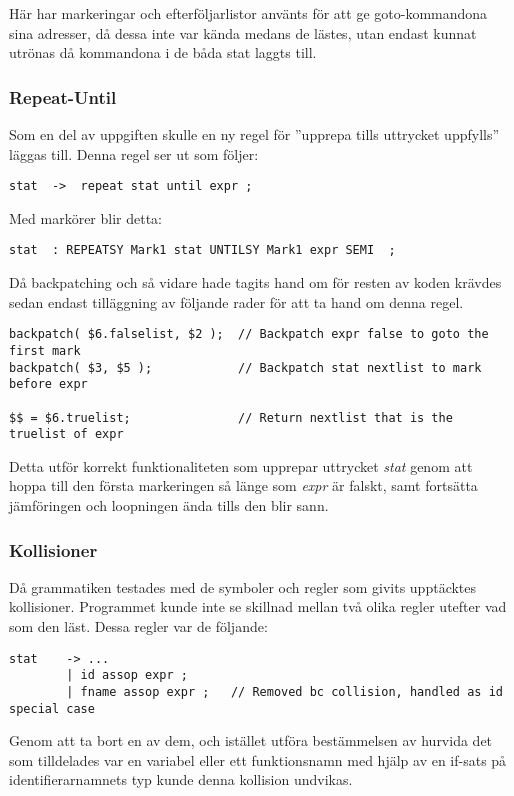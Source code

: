 			Här har markeringar och efterföljarlistor använts för att ge goto-kommandona sina adresser, då
			dessa inte var kända medans de lästes, utan endast kunnat utrönas då kommandona i de båda stat
			laggts till.


		\subsubsection{Repeat-Until}
			Som en del av uppgiften skulle en ny regel för ''upprepa tills uttrycket uppfylls'' läggas till.
			Denna regel ser ut som följer:
\begin{verbatim}
stat  ->  repeat stat until expr ; 	
\end{verbatim}
			Med markörer blir detta:
\begin{verbatim}
stat  : REPEATSY Mark1 stat UNTILSY Mark1 expr SEMI  ; 	
\end{verbatim}

			Då backpatching och så vidare hade tagits hand om för resten av koden krävdes sedan endast tilläggning av följande rader för att ta hand om denna regel.

\begin{verbatim}
backpatch( $6.falselist, $2 ); 	// Backpatch expr false to goto the first mark
backpatch( $3, $5 );            // Backpatch stat nextlist to mark before expr

$$ = $6.truelist;               // Return nextlist that is the truelist of expr
\end{verbatim}

			Detta utför korrekt funktionaliteten som upprepar uttrycket \textit{stat} genom att hoppa till den första markeringen så länge som \textit{expr} är falskt, samt fortsätta jämföringen och loopningen ända tills den blir sann.

		\subsubsection{Kollisioner}
			Då grammatiken testades med de symboler och regler som givits upptäcktes kollisioner. Programmet kunde inte se skillnad mellan två olika regler utefter vad som den läst. Dessa regler var de följande:
\begin{verbatim}
stat    -> ...
        | id assop expr ;
        | fname assop expr ;   // Removed bc collision, handled as id special case
\end{verbatim}

			Genom att ta bort en av dem, och istället utföra bestämmelsen av hurvida det som tilldelades var en variabel eller ett funktionsnamn med hjälp av en if-sats på identifierarnamnets typ kunde denna kollision undvikas.

